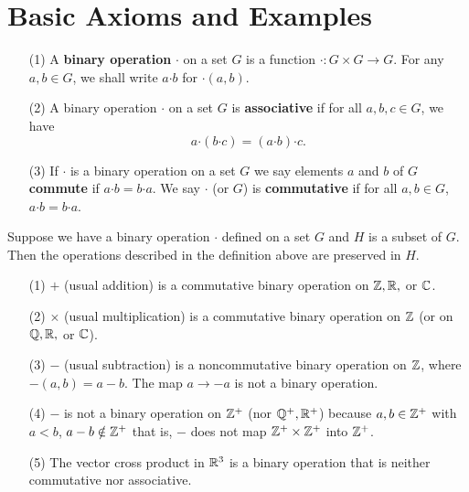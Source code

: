\section{Basic Axioms and Examples}

\begin{definition}
    \begin{enumerate}
        \item[(1)] A \textbf{binary operation} \( \boldsymbol{\cdot}  \) on a set \( G  \) is a function \( \boldsymbol{\cdot} : G \times G \to G  \). For any \( a,b \in G  \), we shall write \( a \boldsymbol{\cdot} b  \) for \( \boldsymbol{\cdot} (a,b) \).
        \item[(2)] A binary operation \( \boldsymbol{\cdot}  \) on a set \( G  \) is \textbf{associative} if for all \( a,b,c \in G  \), we have
            \[  a \boldsymbol{\cdot} (b \boldsymbol{\cdot} c ) = (a \boldsymbol{\cdot}  b ) \boldsymbol{\cdot} c. \]
        \item[(3)] If \( \boldsymbol{\cdot}  \) is a binary operation on a set \( G  \) we say elements \( a  \) and \( b  \) of \( G  \) \textbf{commute} if \( a \boldsymbol{\cdot} b = b \boldsymbol{\cdot} a  \). We say \( \boldsymbol{\cdot}  \) (or \( G \)) is \textbf{commutative} if for all \( a,b \in G  \), \( a \boldsymbol{\cdot} b = b \boldsymbol{\cdot} a   \).
    \end{enumerate}
\end{definition}

Suppose we have a binary operation \( \boldsymbol{\cdot}  \) defined on a set \( G  \) and \( H  \) is a subset of \( G  \). Then the operations described in the definition above are preserved in \( H  \).

\begin{eg}
  \begin{enumerate}
      \item[(1)] \( +  \) (usual addition) is a commutative binary operation on \( \mathbb{Z}, \mathbb{R},  \) or \( \mathbb{C}  \).
        \item[(2)] \( \times  \) (usual multiplication) is a commutative binary operation on \( \mathbb{Z}  \) (or on \( \mathbb{Q}, \mathbb{R}, \) or \( \mathbb{C}  \)).
        \item[(3)] \( -  \) (usual subtraction) is a noncommutative binary operation on \( \mathbb{Z}  \), where \( - (a,b) = a - b  \). The map \( a \to -a  \) is not a binary operation. 
        \item[(4)] \( -  \) is not a binary operation on \( \mathbb{Z}^{+} \) (nor \( \mathbb{Q}^{+}, \mathbb{R}^{+} \)) because \( a,b \in \mathbb{Z}^{+} \) with \( a < b  \), \( a - b \notin \mathbb{Z}^{+} \) that is, \( -  \) does not map \( \mathbb{Z}^{+} \times \mathbb{Z}^{+} \) into \( \mathbb{Z}^{+} \).
        \item[(5)] The vector cross product in \( \mathbb{R}^{3} \) is a binary operation that is neither commutative nor associative.
  \end{enumerate}  
\end{eg}

